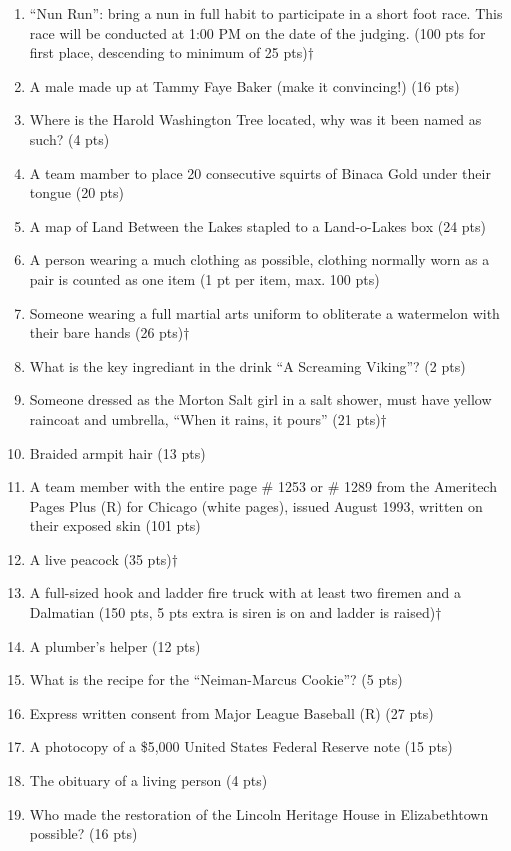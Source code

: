 \begin{enumerate}
\item ``Nun Run'': bring a nun in full habit to participate in a short foot race. This race will be conducted at 1:00 PM on the date of the judging. (100 pts for first place, descending to minimum of 25 pts)$\dagger$
\item A male made up at Tammy Faye Baker (make it convincing!) (16 pts)
\item Where is the Harold Washington Tree located, why was it been named as such? (4 pts)
\item A team mamber to place 20 consecutive squirts of Binaca{\texttrademark} Gold under their tongue (20 pts)
\item A map of Land Between the Lakes stapled to a Land-o-Lakes box (24 pts)
\item A person wearing a much clothing as possible, clothing normally worn as a pair is counted as one item (1 pt per item, max. 100 pts)
\item Someone wearing a full martial arts uniform to obliterate a watermelon with their bare hands (26 pts)$\dagger$
\item What is the key ingrediant in the drink ``A Screaming Viking''? (2 pts)
\item Someone dressed as the Morton Salt girl in a salt shower, must have yellow raincoat and umbrella, ``When it rains, it pours'' (21 pts)$\dagger$
\item Braided armpit hair (13 pts)
\item A team member with the entire page \# 1253 or \# 1289 from the Ameritech Pages Plus (R) for Chicago (white pages), issued August 1993, written on their exposed skin (101 pts)
\item A live peacock (35 pts)$\dagger$
\item A full-sized hook and ladder fire truck with at least two firemen and a Dalmatian (150 pts, 5 pts extra is siren is on and ladder is raised)$\dagger$
\item A plumber's helper (12 pts)
\item What is the recipe for the ``Neiman-Marcus Cookie''? (5 pts)
\item Express written consent from Major League Baseball (R) (27 pts)
\item A photocopy of a \$5,000 United States Federal Reserve note (15 pts)
\item The obituary of a living person (4 pts)
\item Who made the restoration of the Lincoln Heritage House in Elizabethtown possible? (16 pts)

\end{enumerate}
